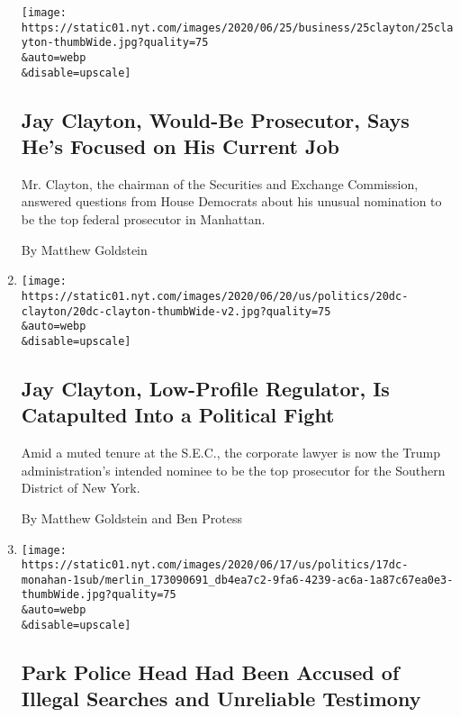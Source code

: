 \begin{enumerate}
  \texttt{[image: https://static01.nyt.com/images/2020/06/25/business/25clayton/25clayton-thumbWide.jpg?quality=75\\\&auto=webp\\\&disable=upscale]}

  \hypertarget{jay-clayton-would-be-prosecutor-says-hes-focused-on-his-current-job}{%
  \subsection{Jay Clayton, Would-Be Prosecutor, Says He's Focused on His
  Current
  Job}\label{jay-clayton-would-be-prosecutor-says-hes-focused-on-his-current-job}}

  Mr. Clayton, the chairman of the Securities and Exchange Commission,
  answered questions from House Democrats about his unusual nomination
  to be the top federal prosecutor in Manhattan.

  By Matthew Goldstein
\item
  \href{/2020/06/20/business/jay-clayton-sdny-sec.html}{}

  \texttt{[image: https://static01.nyt.com/images/2020/06/20/us/politics/20dc-clayton/20dc-clayton-thumbWide-v2.jpg?quality=75\\\&auto=webp\\\&disable=upscale]}

  \hypertarget{jay-clayton-low-profile-regulator-is-catapulted-into-a-political-fight}{%
  \subsection{Jay Clayton, Low-Profile Regulator, Is Catapulted Into a
  Political
  Fight}\label{jay-clayton-low-profile-regulator-is-catapulted-into-a-political-fight}}

  Amid a muted tenure at the S.E.C., the corporate lawyer is now the
  Trump administration's intended nominee to be the top prosecutor for
  the Southern District of New York.

  By Matthew Goldstein and Ben Protess
\item
  \href{/2020/06/18/us/politics/park-police-gregory-monahan.html}{}

  \texttt{[image: https://static01.nyt.com/images/2020/06/17/us/politics/17dc-monahan-1sub/merlin\_173090691\_db4ea7c2-9fa6-4239-ac6a-1a87c67ea0e3-thumbWide.jpg?quality=75\\\&auto=webp\\\&disable=upscale]}

  \hypertarget{park-police-head-had-been-accused-of-illegal-searches-and-unreliable-testimony}{%
  \subsection{Park Police Head Had Been Accused of Illegal Searches and
  Unreliable
  Testimony}\label{park-police-head-had-been-accused-of-illegal-searches-and-unreliable-testimony}}


\end{enumerate}
